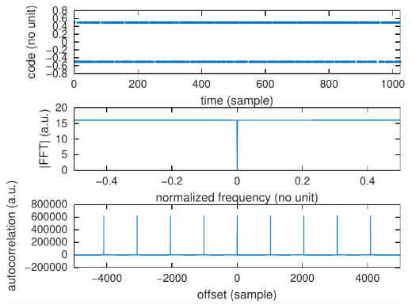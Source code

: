 \documentclass[compress,10pt,aspectratio=169]{beamer}
\begin{document}
\begin{frame}
\begin{minipage}[t]{\linewidth}
\begin{minipage}{.54\linewidth}
\end{minipage}
\begin{minipage}{.45\linewidth}
\includegraphics[width=1.05\linewidth]{10bitPRN.pdf}
\end{minipage}
\end{minipage}
\end{frame}
\end{document}
